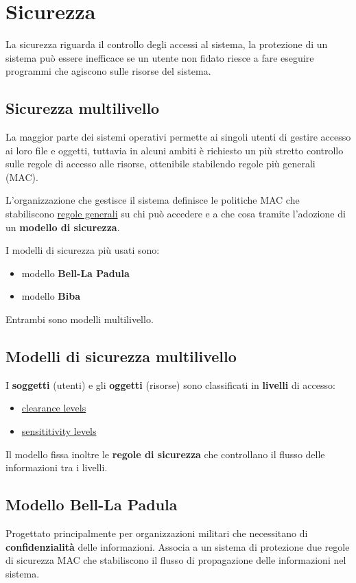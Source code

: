 \section{Sicurezza}

La sicurezza riguarda il controllo degli accessi al sistema, la protezione di un sistema può essere inefficace se un utente non fidato riesce a fare eseguire programmi che agiscono sulle risorse del sistema.

\subsection{Sicurezza multilivello}

La maggior parte dei sistemi operativi permette ai singoli utenti di gestire accesso ai loro file e oggetti, tuttavia in alcuni ambiti è richiesto un più stretto controllo sulle regole di accesso alle risorse, ottenibile stabilendo regole più generali (MAC).

L'organizzazione che gestisce il sistema definisce le politiche MAC che stabiliscono \underline{regole generali} su chi può accedere e a che cosa tramite l'adozione di un \textbf{modello di sicurezza}.

I modelli di sicurezza più usati sono:
\begin{itemize}
    \item modello \textbf{Bell-La Padula} 
    \item modello \textbf{Biba} 
\end{itemize}

Entrambi sono modelli multilivello.

\subsection{Modelli di sicurezza multilivello}
I \textbf{soggetti} (utenti) e gli \textbf{oggetti} (risorse) sono classificati in \textbf{livelli} di accesso:
\begin{itemize}
    \item \underline{clearance levels} 
    \item \underline{sensititivity levels} 
\end{itemize}

Il modello fissa inoltre le \textbf{regole di sicurezza} che controllano il flusso delle informazioni tra i livelli.

\subsection{Modello Bell-La Padula}
Progettato principalmente per organizzazioni militari che necessitano di \textbf{confidenzialità}  delle informazioni. Associa a un sistema di protezione due regole di sicurezza MAC che stabiliscono il flusso di propagazione delle informazioni nel sistema.

